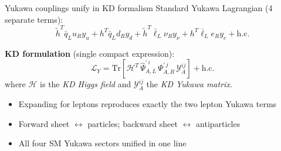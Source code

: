 \documentclass[aspectratio=169]{beamer}
\newcommand{\Blue}[1]{{\color{cptblue}#1}}
\newcommand{\Green}[1]{{\color{cptgreen}#1}}
\newcommand{\figpath}{../figures/}   %
\begin{document}
\begin{frame}{Yukawa couplings unify in KD formalism}
  Standard Yukawa Lagrangian (4 separate terms):
  \[
    \tilde h^T\bar q_L u_R y_u + h^T\bar q_L d_R y_d
    + \tilde h^T\bar\ell_L \nu_R y_\nu + h^T\bar\ell_L e_R y_e
    + \text{h.c.}
  \]

  \vspace{0.3em}
  \textbf{KD formulation} (single compact expression):
  \[
    \mathcal{L}_Y = \mathrm{Tr}\!\left[
      \mathcal{H}^T\,\widehat\Psi_{A,L}^{\prime\,i}\,\Psi_{A,R}^{\prime\,j}\,
      \mathcal{Y}_A^{ij}
    \right] + \text{h.c.}
  \]
  where $\mathcal{H}$ is the \emph{KD Higgs field} and
  $\mathcal{Y}_A^{ij}$ the \emph{KD Yukawa matrix}.

  \vspace{0.4em}
  \begin{itemize}
    \item Expanding for leptons reproduces exactly the two lepton Yukawa terms
    \item Forward sheet $\leftrightarrow$ particles; backward sheet $\leftrightarrow$ antiparticles
    \item \Blue{All four SM Yukawa sectors unified in one line}
  \end{itemize}
\end{frame}

\end{document}
